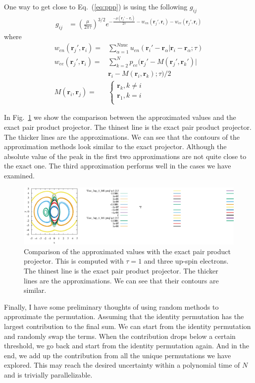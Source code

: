 \documentclass[aps,prl,reprint,groupedaddress]{revtex4-1}
\begin{document}
One way to get close to Eq.~(\ref{eq:ppp}) is using the following $g_{ij}$
\begin{align}
\label{eq:eq:gUee3}
g_{ij} & =
\left(\frac{\mu}{2\pi\tau} \right )^{3/2}e^{-\frac{-\mu(\bm{r}_j'-\bm{r}_i)}{2\tau}-w_{en}(\bm{r}_j',\bm{r}_i)-w_{ee}(\bm{r}_j', \bm{r}_i)}
\end{align}
where
\begin{align}
w_{en}(\bm{r}_j',\bm{r}_i) = &
\sum\limits_{\alpha=1}^{N\mathrm{nuc}}u_{en}(\bm{r}_i'-\bm{r}_\alpha|\bm{r}_i-\bm{r}_\alpha;\tau)\\
w_{ee}(\bm{r}_j',\bm{r}_i) = &
\sum\limits_{k=2}^{N}p_{ee}(\bm{r}_j'-M(\bm{r}_j',\bm{r}_k')|\\
 & \bm{r}_i-M(\bm{r}_i,\bm{r}_k);\tau)/2\\
M(\bm{r}_i,\bm{r}_j) = &
\left\{\begin{matrix}
\bm{r}_k, k \neq i\\
\bm{r}_1, k = i\\
\end{matrix}\right.
\end{align}

In Fig.~\ref{fig:comp} we show the comparison between the approximated values and the exact pair product projector.
The thinest line is the exact pair product projector.
The thicker lines are the approximations.
We can see that the contours of the approximation methods look similar to the exact projector.
Although the absolute value of the peak in the first two approximations are not quite close to the exact one.
The third approximation performs well in the cases we have examined.

\begin{figure}
\includegraphics[scale=0.8,clip,trim=0 0 23cm 0]{Test_3up_1=1_mod}%
\caption{\label{fig:comp}
Comparison of the approximated values with the exact pair product projector.
This is computed with $\tau = 1$ and three up-spin electrons.
The thinest line is the exact pair product projector.
The thicker lines are the approximations.
We can see that their contours are similar.
}
\end{figure}

Finally, I have some preliminary thoughts of using random methods to approximate the permutation.
Assuming that the identity permutation has the largest contribution to the final sum.
We can start from the identity permutation and randomly swap the terms.
When the contribution drops below a certain threshold, we go back and start from the identity permutation again.
And in the end, we add up the contribution from all the unique permutations we have explored.
This may reach the desired uncertainty within a polynomial time of $N$ and is trivially parallelizable.
\end{document}
